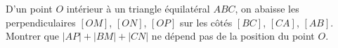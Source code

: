 D'un point $O$ intérieur à un triangle équilatéral $ABC$, on abaisse les perpendiculaires $[OM]$, $[ON]$, $[OP]$ sur les côtés $[BC]$, $[CA]$, $[AB]$. Montrer que $|AP| + |BM| + |CN|$ ne dépend pas de la position du point $O$.
